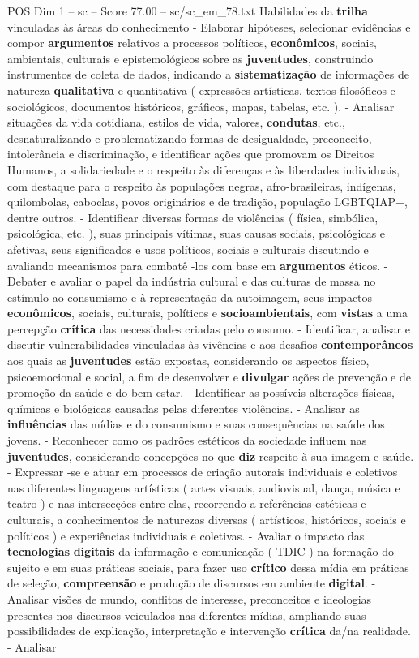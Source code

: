 \begin{textsample}{POS Dim 1 – sc – Score 77.00 – sc/sc\_em\_78.txt}
Habilidades da \textbf{trilha} vinculadas às áreas do conhecimento - Elaborar hipóteses, selecionar evidências e compor \textbf{argumentos} relativos a processos políticos, \textbf{econômicos}, sociais, ambientais, culturais e epistemológicos sobre as \textbf{juventudes}, construindo instrumentos de coleta de dados, indicando a \textbf{sistematização} de informações de natureza \textbf{qualitativa} e quantitativa ( expressões artísticas, textos filosóficos e sociológicos, documentos históricos, gráficos, mapas, tabelas, etc. ). - Analisar situações da vida cotidiana, estilos de vida, valores, \textbf{condutas}, etc., desnaturalizando e problematizando formas de desigualdade, preconceito, intolerância e discriminação, e identificar ações que promovam os Direitos Humanos, a solidariedade e o respeito às diferenças e às liberdades individuais, com destaque para o respeito às populações negras, afro-brasileiras, indígenas, quilombolas, caboclas, povos originários e de tradição, população LGBTQIAP+, dentre outros. - Identificar diversas formas de violências ( física, simbólica, psicológica, etc. ), suas principais vítimas, suas causas sociais, psicológicas e afetivas, seus significados e usos políticos, sociais e culturais discutindo e avaliando mecanismos para combatê -los com base em \textbf{argumentos} éticos. - Debater e avaliar o papel da indústria cultural e das culturas de massa no estímulo ao consumismo e à representação da autoimagem, seus impactos \textbf{econômicos}, sociais, culturais, políticos e \textbf{socioambientais}, com \textbf{vistas} a uma percepção \textbf{crítica} das necessidades criadas pelo consumo. - Identificar, analisar e discutir vulnerabilidades vinculadas às vivências e aos desafios \textbf{contemporâneos} aos quais as \textbf{juventudes} estão expostas, considerando os aspectos físico, psicoemocional e social, a fim de desenvolver e \textbf{divulgar} ações de prevenção e de promoção da saúde e do bem-estar. - Identificar as possíveis alterações físicas, químicas e biológicas causadas pelas diferentes violências. - Analisar as \textbf{influências} das mídias e do consumismo e suas consequências na saúde dos jovens. - Reconhecer como os padrões estéticos da sociedade influem nas \textbf{juventudes}, considerando concepções no que \textbf{diz} respeito à sua imagem e saúde. - Expressar -se e atuar em processos de criação autorais individuais e coletivos nas diferentes linguagens artísticas ( artes visuais, audiovisual, dança, música e teatro ) e nas intersecções entre elas, recorrendo a referências estéticas e culturais, a conhecimentos de naturezas diversas ( artísticos, históricos, sociais e políticos ) e experiências individuais e coletivas. - Avaliar o impacto das \textbf{tecnologias} \textbf{digitais} da informação e comunicação ( TDIC ) na formação do sujeito e em suas práticas sociais, para fazer uso \textbf{crítico} dessa mídia em práticas de seleção, \textbf{compreensão} e produção de discursos em ambiente \textbf{digital}. - Analisar visões de mundo, conflitos de interesse, preconceitos e ideologias presentes nos discursos veiculados nas diferentes mídias, ampliando suas possibilidades de explicação, interpretação e intervenção \textbf{crítica} da/na realidade. - Analisar 
\end{textsample}
